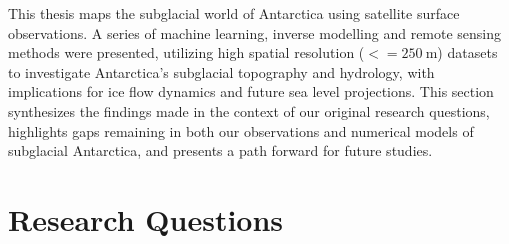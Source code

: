 
This thesis maps the subglacial world of Antarctica using satellite surface observations.
A series of machine learning, inverse modelling and remote sensing methods were presented, utilizing high spatial resolution ($<= \SI{250}{\metre}$) datasets to investigate Antarctica's subglacial topography and hydrology, with implications for ice flow dynamics and future sea level projections.
This section synthesizes the findings made in the context of our original research questions, highlights gaps remaining in both our observations and numerical models of subglacial Antarctica, and presents a path forward for future studies.

\section{Research Questions}

